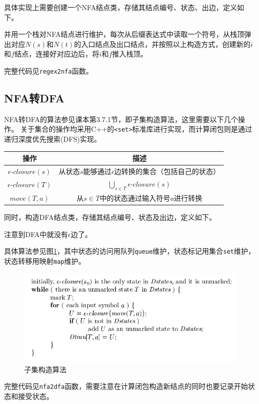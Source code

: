 \documentclass[logo,reportComp]{thesis}
\begin{document}
具体实现上需要创建一个NFA结点类，存储其结点编号、状态、出边，定义如下。

并用一个栈对NFA结点进行维护，每次从后缀表达式中读取一个符号，从栈顶弹出对应$N(s)$和$N(t)$的入口结点及出口结点，并按照以上构造方式，创建新的$i$和$f$结点，连接好对应边后，将$i$和$f$推入栈顶。

完整代码见\verb'regex2nfa'函数。

\subsection{NFA转DFA}
NFA转DFA的算法参见课本第3.7.1节，即子集构造算法，这里需要以下几个操作。
关于集合的操作均采用C++的\verb'<set>'标准库进行实现，而计算闭包则是通过递归深度优先搜索(DFS)实现。
\begin{center}
\begin{tabular}{|c|c|}\hline
操作 & 描述\\\hline
$\epsilon$-$closure(s)$ & 从状态$s$能够通过$\epsilon$边转换的集合（包括自己的状态）\\\hline
$\epsilon$-$closure(T)$ & $\bigcup_{s\in T}\epsilon$-$closure(s)$\\\hline
$move(T,a)$ & 从$s\in T$中的状态通过输入符号$a$进行转换\\\hline
\end{tabular}
\end{center}

同时，构造DFA结点类，存储其结点编号、状态及出边，定义如下。

注意到DFA中就没有$\epsilon$边了。

具体算法参见图\ref{fig:nfa2dfa}，其中状态的访问用队列\verb'queue'维护，状态标记用集合\verb'set'维护，状态转移用映射\verb'map'维护。
\begin{figure}[H]
\centering
\includegraphics[width=0.9\linewidth]{fig/nfa2dfa.jpg}
\caption{子集构造算法}
\label{fig:nfa2dfa}
\end{figure}

完整代码见\verb'nfa2dfa'函数，需要注意在计算闭包构造新结点的同时也要记录开始状态和接受状态。
\end{document}

